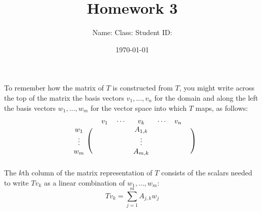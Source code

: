 \documentclass[a4paper,11pt]{article}
\title{Homework 3}
\author{Name:\hspace{5em} Class:\hspace{7em} Student ID: \qquad\qquad}
\date{\today}
\begin{document}
\maketitle

\begin{tcolorbox}[colback=white,colframe=black,fonttitle=\bfseries]
To remember how the matrix of $T$ is constructed from $T$, you might write across the
top of the matrix the basis vectors $v_1,\dots,v_n$ for the domain and along the left the
basis vectors $w_1,\dots,w_m$ for the vector space into which $T$ maps, as follows:
\begin{equation*}
   \begin{blockarray}{cccccccc}
       & & v_1 & \cdots &   v_k   & \cdots & v_n & \\
\begin{block}{c(ccccccc)}
w_1    & &     &        & A_{1,k} &        &     & \\
\vdots & &     &        & \vdots  &        &     & \\
w_m    & &     &        & A_{m,k} &        &     & \\
\end{block}
\end{blockarray}
\end{equation*}
The $k$th column of the matrix representation of $T$ consists of
the scalars needed to write $Tv_k$ as a
linear combination of $w_1,\dots,w_m$:
\[Tv_k = \sum_{j=1}^{m} A_{j,k}w_j\]
\end{tcolorbox}
\end{document}
